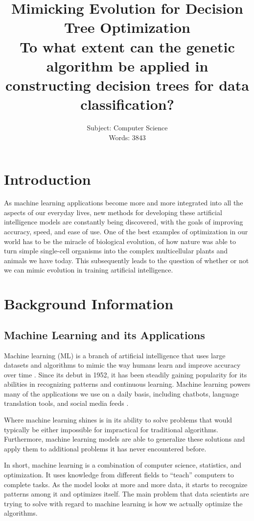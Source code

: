 \documentclass[12pt]{article}
\title{
    Mimicking Evolution for Decision Tree Optimization \\ [6pt]
    \large To what extent can the genetic algorithm be applied in \\
    constructing decision trees for data classification?
}
\author{
    Subject: Computer Science \\
    Words: 3843
}
\date{} %
\begin{document}
\maketitle
\newpage
\tableofcontents
\newpage

\section{Introduction}

As machine learning applications become more and more integrated into all the aspects of our everyday lives, new methods for developing these artificial intelligence models are constantly being discovered, with the goals of improving accuracy, speed, and ease of use. One of the best examples of optimization in our world has to be the miracle of biological evolution, of how nature was able to turn simple single-cell organisms into the complex multicellular plants and animals we have today. This subsequently leads to the question of whether or not we can mimic evolution in training artificial intelligence.

\section{Background Information}

\subsection{Machine Learning and its Applications}

Machine learning (ML) is a branch of artificial intelligence that uses large datasets and algorithms to mimic the way humans learn and improve accuracy over time \cite{what_is_ml_ibm}. Since its debut in 1952, it has been steadily gaining popularity for its abilities in recognizing patterns and continuous learning. Machine learning powers many of the applications we use on a daily basis, including chatbots, language translation tools, and social media feeds \cite{what_is_ml_mit}.

Where machine learning shines is in its ability to solve problems that would typically be either impossible for impractical for traditional algorithms. Furthermore, machine learning models are able to generalize these solutions and apply them to additional problems it has never encountered before.

In short, machine learning is a combination of computer science, statistics, and optimization. It uses knowledge from different fields to ``teach'' computers to complete tasks. As the model looks at more and more data, it starts to recognize patterns among it and optimizes itself. The main problem that data scientists are trying to solve with regard to machine learning is how we actually optimize the algorithms.
\end{document}
